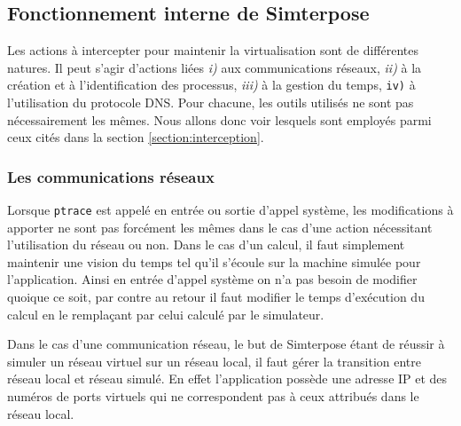\subsection{Fonctionnement interne de Simterpose}
\label{subsection:fonctionnement_simterpose}

Les actions à intercepter pour maintenir la virtualisation sont de différentes
natures. Il peut s'agir d'actions liées \textit{i)} aux communications réseaux,
\textit{ii)} à la création et à l'identification des processus, \textit{iii)} à
la gestion du temps, \texttt{iv)} à l'utilisation du protocole DNS. Pour chacune, les outils utilisés ne sont pas nécessairement les mêmes. Nous allons donc voir
lesquels sont employés parmi ceux cités dans la section
\ref{section:interception}.

\subsubsection{Les communications réseaux}
\label{subsubsection:fonctionnement_reseau}

Lorsque \texttt{ptrace} est appelé en entrée ou sortie d'appel système, les
modifications à apporter ne sont pas forcément les mêmes dans le cas d'une
action nécessitant l'utilisation du réseau ou non. Dans le cas d'un calcul, il
faut simplement maintenir une vision du temps tel qu'il s'écoule sur la machine
simulée pour l'application. Ainsi en entrée d'appel système on n'a pas besoin de
modifier quoique ce soit, par contre au retour il faut modifier le temps
d'exécution du calcul en le remplaçant par celui calculé par le simulateur.

Dans le cas d'une communication réseau, le but de Simterpose étant de réussir à
simuler un réseau virtuel sur un réseau local, il faut gérer la
transition entre réseau local et réseau simulé. En effet l'application possède
une adresse IP et des numéros de ports virtuels qui ne correspondent pas à ceux attribués dans le réseau local.

